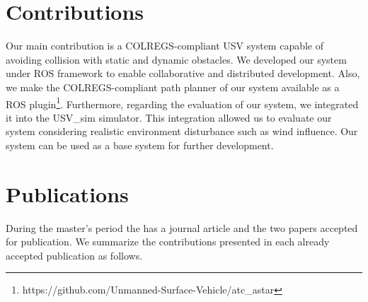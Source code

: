     
    \section{Contributions}
    
    
     Our main contribution is a \ac{COLREGS}-compliant \ac{USV} system capable of avoiding collision with static and dynamic obstacles. We developed our system under \ac{ROS} framework to enable collaborative and distributed development. Also, we make the COLREGS-compliant path planner of our system available as a \ac{ROS} plugin\footnote{https://github.com/Unmanned-Surface-Vehicle/atc\_astar}. Furthermore, regarding the evaluation of our system, we integrated it into the USV\_sim simulator. This integration allowed us to evaluate our system considering realistic environment disturbance such as wind influence. Our system can be used as a base system for further development.

    \section{Publications}
    
    During the master's period the has a journal article and the two papers accepted for publication. We summarize the contributions presented in each already accepted publication as follows.
    
